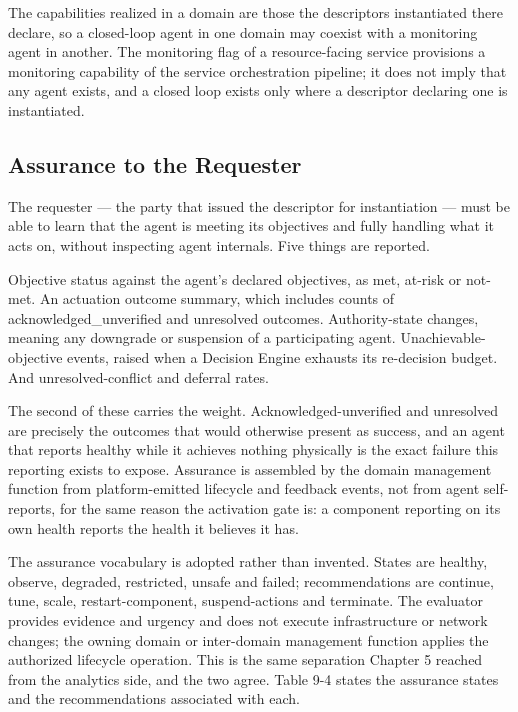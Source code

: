 The capabilities realized in a domain are those the descriptors
instantiated there declare, so a closed-loop agent in one domain may
coexist with a monitoring agent in another. The monitoring flag of a
resource-facing service provisions a monitoring capability of the
service orchestration pipeline; it does not imply that any agent exists,
and a closed loop exists only where a descriptor declaring one is
instantiated.

\hypertarget{assurance-to-the-requester}{%
\subsection{Assurance to the Requester}\label{assurance-to-the-requester}}

The requester --- the party that issued the descriptor for instantiation
--- must be able to learn that the agent is meeting its objectives and
fully handling what it acts on, without inspecting agent internals. Five
things are reported.

Objective status against the agent's declared objectives, as met,
at-risk or not-met. An actuation outcome summary, which includes counts
of acknowledged\_\allowbreak{}unverified and unresolved outcomes.
Authority-state changes, meaning any downgrade or suspension of a
participating agent. Unachievable-objective events, raised when a
Decision Engine exhausts its re-decision budget. And unresolved-conflict
and deferral rates.

The second of these carries the weight. Acknowledged-unverified and
unresolved are precisely the outcomes that would otherwise present as
success, and an agent that reports healthy while it achieves nothing
physically is the exact failure this reporting exists to expose.
Assurance is assembled by the domain management function from
platform-emitted lifecycle and feedback events, not from agent
self-reports, for the same reason the activation gate is: a component
reporting on its own health reports the health it believes it has.

The assurance vocabulary is adopted rather than invented. States are
healthy, observe, degraded, restricted, unsafe and failed;
recommendations are continue, tune, scale, restart-component,
suspend-actions and terminate. The evaluator provides evidence and
urgency and does not execute infrastructure or network changes; the
owning domain or inter-domain management function applies the authorized
lifecycle operation. This is the same separation Chapter 5 reached from
the analytics side, and the two agree. Table 9-4 states the assurance
states and the recommendations associated with each.

